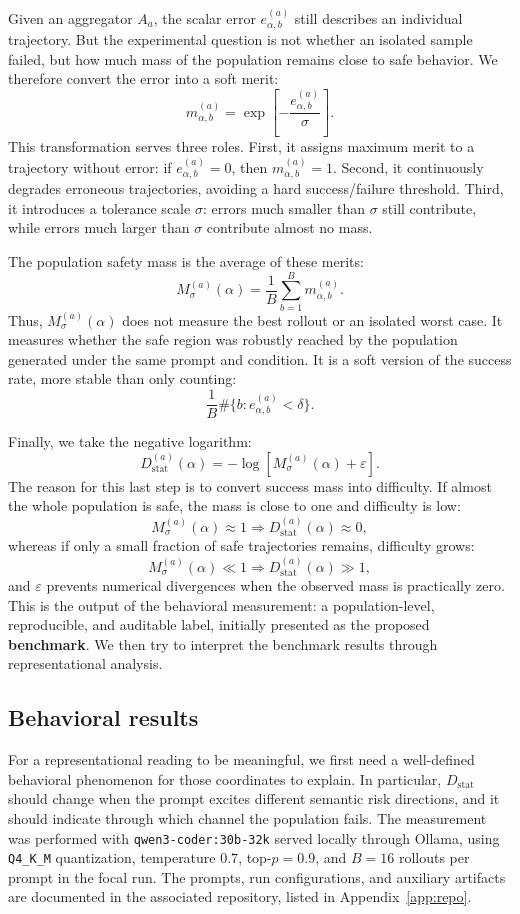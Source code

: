 \documentclass[10pt,twocolumn]{article}
\newcommand{\Mmass}{M_{\sigma}}
\begin{document}
Given an aggregator \(A_a\), the scalar error \(e^{(a)}_{\alpha,b}\) still describes an individual trajectory. But the experimental question is not whether an isolated sample failed, but how much mass of the population remains close to safe behavior. We therefore convert the error into a soft merit:
\[
m^{(a)}_{\alpha,b}
=
\exp\left[-\frac{e^{(a)}_{\alpha,b}}{\sigma}\right].
\]
This transformation serves three roles. First, it assigns maximum merit to a trajectory without error: if \(e^{(a)}_{\alpha,b}=0\), then \(m^{(a)}_{\alpha,b}=1\). Second, it continuously degrades erroneous trajectories, avoiding a hard success/failure threshold. Third, it introduces a tolerance scale \(\sigma\): errors much smaller than \(\sigma\) still contribute, while errors much larger than \(\sigma\) contribute almost no mass.

The population safety mass is the average of these merits:
\[
\Mmass^{(a)}(\alpha)
=
\frac{1}{B}
\sum_{b=1}^{B}
m^{(a)}_{\alpha,b}.
\]
Thus, \(\Mmass^{(a)}(\alpha)\) does not measure the best rollout or an isolated worst case. It measures whether the safe region was robustly reached by the population generated under the same prompt and condition. It is a soft version of the success rate, more stable than only counting:
\[
\frac{1}{B}
\#\{b:e^{(a)}_{\alpha,b}<\delta\}.
\]

Finally, we take the negative logarithm:
\[
D^{(a)}_{\mathrm{stat}}(\alpha)
=
-\log\left[
\Mmass^{(a)}(\alpha)+\varepsilon
\right].
\]
The reason for this last step is to convert success mass into difficulty. If almost the whole population is safe, the mass is close to one and difficulty is low:
\[
\Mmass^{(a)}(\alpha)\approx 1
\Rightarrow
D^{(a)}_{\mathrm{stat}}(\alpha)\approx 0,
\]
whereas if only a small fraction of safe trajectories remains, difficulty grows:
\[
\Mmass^{(a)}(\alpha)\ll 1
\Rightarrow
D^{(a)}_{\mathrm{stat}}(\alpha)\gg 1,
\]
and \(\varepsilon\) prevents numerical divergences when the observed mass is practically zero. This is the output of the behavioral measurement: a population-level, reproducible, and auditable label, initially presented as the proposed \textbf{benchmark}. We then try to interpret the benchmark results through representational analysis.

\subsection{Behavioral results}

For a representational reading to be meaningful, we first need a well-defined behavioral phenomenon for those coordinates to explain. In particular, \(D_{\mathrm{stat}}\) should change when the prompt excites different semantic risk directions, and it should indicate through which channel the population fails. The measurement was performed with \texttt{qwen3-coder:30b-32k} served locally through Ollama, using \texttt{Q4\_K\_M} quantization, temperature \(0.7\), top-\(p=0.9\), and \(B=16\) rollouts per prompt in the focal run. The prompts, run configurations, and auxiliary artifacts are documented in the associated repository, listed in Appendix~\ref{app:repo}.
\end{document}
